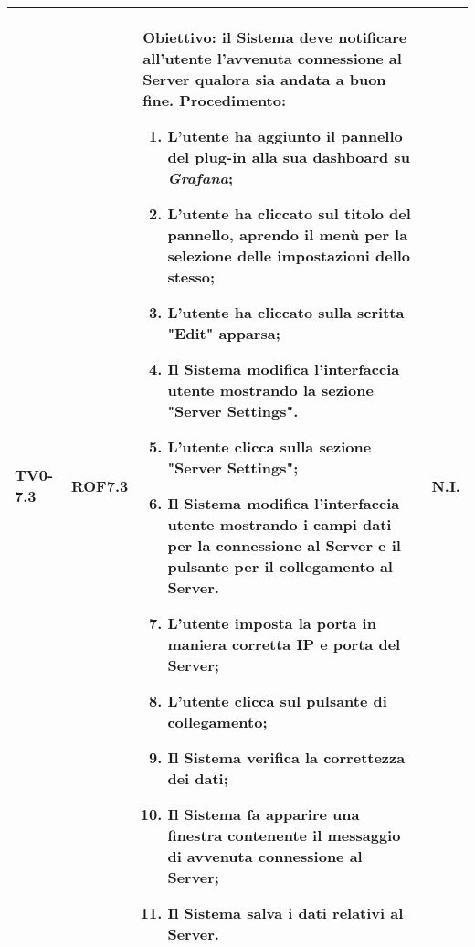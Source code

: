 \begin{longtable}{|C{.15\textwidth}|C{.13\textwidth}|m{.65\textwidth}|C{.08\textwidth}|}
TV0-7.3 & ROF7.3 &
	\textbf{Obiettivo}: il Sistema deve notificare all'utente l'avvenuta connessione al Server qualora sia andata a buon fine. \newline
	\textbf{Procedimento}:
	\begin{enumerate}
		\item L'utente ha aggiunto il pannello del plug-in alla sua dashboard su \textit{Grafana};
		\item L'utente ha cliccato sul titolo del pannello, aprendo il menù per la selezione delle impostazioni dello stesso;
		\item L'utente ha cliccato sulla scritta "Edit" apparsa;
		\item Il Sistema modifica l'interfaccia utente mostrando la sezione "Server Settings".
		\item L'utente clicca sulla sezione "Server Settings";
		\item Il Sistema modifica l'interfaccia utente mostrando i campi dati per la connessione al Server e il pulsante per il collegamento al Server.
		\item L'utente imposta la porta in maniera corretta IP e porta del Server;
		\item L'utente clicca sul pulsante di collegamento;
		\item Il Sistema verifica la correttezza dei dati;
		\item Il Sistema fa apparire una finestra contenente il messaggio di avvenuta connessione al Server;
		\item Il Sistema salva i dati relativi al Server.
	\end{enumerate}
	& N.I. \\
\hline


\end{longtable}
